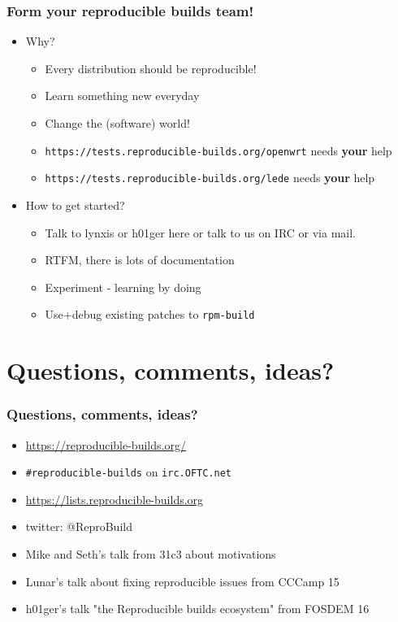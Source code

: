 \documentclass[14pt,aspectratio=169]{beamer}
\begin{document}
\begin{frame}
 \frametitle{Form your reproducible builds team!}

 \begin{itemize}
  \item Why?
   \begin{itemize}
    \item Every distribution should be reproducible!
    \item Learn something new everyday
    \item Change the (software) world!
    \item \texttt{https://tests.reproducible-builds.org/openwrt} needs \textbf{your} help
    \item \texttt{https://tests.reproducible-builds.org/lede} needs \textbf{your} help
   \end{itemize}
  \item How to get started?
   \begin{itemize}
    \item Talk to lynxis or h01ger here or talk to us on IRC or via mail.
    \item RTFM, there is lots of documentation
    \item Experiment - learning by doing
    \item Use+debug existing patches to \texttt{rpm-build}
   \end{itemize}
 \end{itemize}
\end{frame}

\section{Questions, comments, ideas?}


\begin{frame}
 \frametitle{Questions, comments, ideas?}

 \begin{itemize}
  \item \url{https://reproducible-builds.org/}
  \item \texttt{\#reproducible-builds} on \texttt{irc.OFTC.net}
  \item \url{https://lists.reproducible-builds.org}
  \item twitter: @ReproBuild
  \item<2> Mike and Seth's talk from 31c3 about motivations
  \item<2> Lunar's talk about fixing reproducible issues from CCCamp 15
  \item<2> h01ger's talk "the Reproducible builds ecosystem" from FOSDEM 16
  \end{itemize}
\end{frame}
\end{document}
